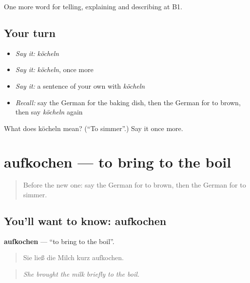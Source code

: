 \begin{grammarlens}[title={What you've built}]
One more word for telling, explaining and describing at B1.
\end{grammarlens}

\subsection*{Your turn}
\begin{itemize}
\raggedright
  \item \emph{Say it:} \emph{köcheln}
  \item \emph{Say it:} \emph{köcheln}, once more
  \item \emph{Say it:} a sentence of your own with \emph{köcheln}
  \item \emph{Recall:} say the German for the baking dish, then the German for to brown, then say \emph{köcheln} again
\end{itemize}

\begin{tcolorbox}[breakable,colback=teal!4,colframe=teal!35!black,title={Before you move on}]
What does köcheln mean? (\textquotedblleft{}To simmer\textquotedblright{}.) Say it once more.
\end{tcolorbox}
\section[aufkochen]{aufkochen — to bring to the boil}

\label{lesson:GE-C327-aufkochen}



\begin{quote}
Before the new one: say the German for to brown, then the German for to simmer.
\end{quote}

\subsection*{You'll want to know: aufkochen}
\textbf{aufkochen} — \textquotedblleft{}to bring to the boil\textquotedblright{}.

\begin{quote}
Sie ließ die Milch kurz aufkochen.
\end{quote}

\begin{quote}
\emph{She brought the milk briefly to the boil.}
\end{quote}

